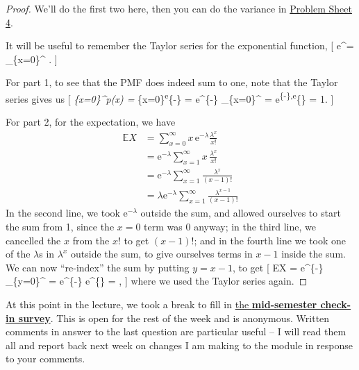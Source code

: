 \documentclass[
  letterpaper,
  DIV=11,
  numbers=noendperiod]{scrreprt}
\theoremstyle{remark}
\begin{document}
\begin{proof}

We'll do the first two here, then you can do the variance in
\protect\hyperlink{P4-long}{Problem Sheet 4}.

It will be useful to remember the Taylor series for the exponential
function, {[} \mathrm e\^{}\lambda =
\sum\_\{x=0\}\^{}\infty {} . {]}

For part 1, to see that the PMF does indeed sum to one, note that the
Taylor series gives us {[} \sum\emph{\{x=0\}\^{}\infty p(x) =
\sum}\{x=0\}\textsuperscript{\infty \mathrm e}\{-\lambda\}
 = \mathrm e\^{}\{-\lambda\}
\sum\_\{x=0\}\^{}\infty  {} =
\mathrm e\textsuperscript{\{-\lambda\},\mathrm e}\{\lambda\} = 1. {]}

For part 2, for the expectation, we have \begin{align*}
\mathbb EX &= \sum_{x=0}^\infty x\,\mathrm e^{-\lambda}  \frac{\lambda^x}{x!} \\
  &= \mathrm e^{-\lambda} \sum_{x=1}^\infty x\,\frac{\lambda^x}{x!} \\
  &= \mathrm e^{-\lambda} \sum_{x=1}^\infty \frac{\lambda^x}{(x-1)!} \\
  &= \lambda \mathrm e^{-\lambda} \sum_{x=1}^\infty \frac{\lambda^{x-1}}{(x-1)!}
\end{align*} In the second line, we took \(\mathrm e^{-\lambda}\)
outside the sum, and allowed ourselves to start the sum from 1, since
the \(x = 0\) term was 0 anyway; in the third line, we cancelled the
\(x\) from the \(x!\) to get \((x-1)!\); and in the fourth line we took
one of the \(\lambda\)s in \(\lambda^x\) outside the sum, to give
ourselves terms in \(x - 1\) inside the sum. We can now ``re-index'' the
sum by putting \(y = x - 1\), to get {[} \mathbb EX =
\lambda \mathrm e\^{}\{-\lambda\}
\sum\_\{y=0\}\^{}\infty {} =
\lambda \mathrm e\^{}\{-\lambda\} \mathrm e\^{}\{\lambda\} = \lambda ,
{]} where we used the Taylor series again.

\end{proof}

At this point in the lecture, we took a break to fill in
\href{https://forms.office.com/Pages/ResponsePage.aspx?id=qO3qvR3IzkWGPlIypTW3ywARQdZlKXRHsLcXi_ngX8NUNkoxWUlTSTBXQUVSUThGU0pXOTMwTjA0UC4u}{the
\textbf{mid-semester check-in survey}}. This is open for the rest of the
week and is anonymous. Written comments in answer to the last question
are particular useful -- I will read them all and report back next week
on changes I am making to the module in response to your comments.
\end{document}
